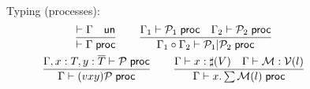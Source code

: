 \begin{figure}[h!]
  Typing (processes):\hfill{}
    \begin{gather*}
      \frac{\Alg \Gamma\quad\un}{\Alg \Gamma\;\prock}\qquad
      \frac{\algprocin{\Gamma_1}{\proc{P}_1} \;\prock \quad \algprocin{\Gamma_2}{\proc{P}_2} \;\prock}
      {\algprocin{\splitContext{\Gamma_1}{\Gamma_2}}{\proc{P}_1|\proc{P}_2}\;\prock}
      \\
      \frac{\algprocin{\Gamma,x:T,y:\dual{T}}{\proc{P}\;\prock}}
           {\algprocin{\Gamma}{(vxy)\proc{P}\;\prock}} \qquad
      \frac{\algprocin{\Gamma}{x:\sharp \proc(V)}\quad\algprocin{\Gamma}{\choice : \proc{V}(l)} }
           {\algprocin{\Gamma}{x . \sum \choice(l)\;\prock}}
%
    \end{gather*}
\end{figure}


